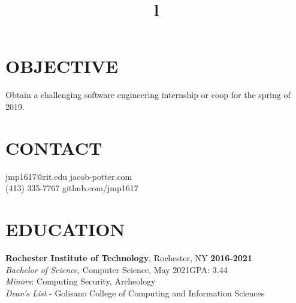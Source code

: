 \documentclass[line,margin]{res}
\begin{document}
\begin{resume}

\section{OBJECTIVE}
Obtain a challenging software engineering internship or coop for the spring of 2019.

\section{CONTACT}
{jmp1617@rit.edu}\hfill 
{jacob-potter.com}\\
(413) 335-7767\hfill 
{github.com/jmp1617}

\section{EDUCATION}
\textbf{Rochester Institute of Technology}, Rochester, NY\hfill
    \textbf{2016-2021}\\
{\sl Bachelor of Science}, Computer Science, May 2021\hfill GPA: 3.44
\\
{\sl Minors}: Computing Security, Archeology
\\
{\sl Dean's List} - Golisano College of Computing and Information Sciences

\begin{format}
\title{l}\\
\\
\body\\
\end{format}

\end{resume}
\end{document}
